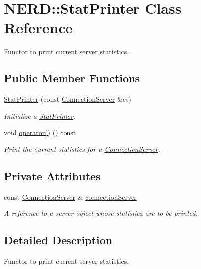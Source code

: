 \hypertarget{classNERD_1_1StatPrinter}{
\section{\-N\-E\-R\-D\-:\-:\-Stat\-Printer \-Class \-Reference}
\label{classNERD_1_1StatPrinter}
}


\-Functor to print current server statistics.  


\subsection*{\-Public \-Member \-Functions}
\begin{DoxyCompactItemize}
\item 
\hyperlink{classNERD_1_1StatPrinter_a9e15d664037ee9b034a20e4a2c758e37}{\-Stat\-Printer} (const \hyperlink{classNERD_1_1ConnectionServer}{\-Connection\-Server} \&cs)
\begin{DoxyCompactList}\small\item\em \-Initialize a \hyperlink{classNERD_1_1StatPrinter}{\-Stat\-Printer}. \end{DoxyCompactList}\item 
void \hyperlink{classNERD_1_1StatPrinter_a276b7e4358a2cd8ec5a3972f86452d2c}{operator()} () const 
\begin{DoxyCompactList}\small\item\em \-Print the current statistics for a \hyperlink{classNERD_1_1ConnectionServer}{\-Connection\-Server}. \end{DoxyCompactList}\end{DoxyCompactItemize}
\subsection*{\-Private \-Attributes}
\begin{DoxyCompactItemize}
\item 
const \hyperlink{classNERD_1_1ConnectionServer}{\-Connection\-Server} \& \hyperlink{classNERD_1_1StatPrinter_a6040df27f017b5ce2ac0ed1d9f68d50b}{connection\-Server}
\begin{DoxyCompactList}\small\item\em \-A reference to a server object whose statistica are to be printed. \end{DoxyCompactList}\end{DoxyCompactItemize}


\subsection{\-Detailed \-Description}
\-Functor to print current server statistics. 

